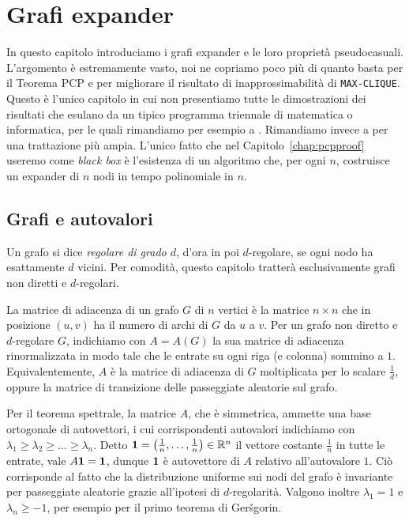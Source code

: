 \chapter{Grafi expander} \label{chap:expander}

In questo capitolo introduciamo i grafi expander e le loro proprietà
pseudocasuali. L'argomento è estremamente vasto, noi ne copriamo poco più di
quanto basta per il Teorema PCP e per migliorare il risultato di
inapprossimabilità di \texttt{MAX-CLIQUE}.
Questo è l'unico capitolo in cui non presentiamo tutte le dimostrazioni dei
risultati che esulano da un tipico programma triennale di matematica o
informatica, per le quali rimandiamo per esempio a \cite{ABbook}.
Rimandiamo invece a \cite{Tre16, HLW06} per una trattazione più ampia.
L'unico fatto che nel Capitolo~\ref{chap:pcpproof} useremo come
\emph{black box} è l'esistenza di un algoritmo che, per ogni $n$, costruisce
un expander di $n$ nodi in tempo polinomiale in $n$.

\section{Grafi e autovalori}

Un grafo si dice \emph{regolare di grado $d$}, d'ora in poi $d$-regolare, se
ogni nodo ha esattamente $d$ vicini. Per comodità, questo capitolo tratterà
esclusivamente grafi non diretti e $d$-regolari.

La matrice di adiacenza di un grafo $G$ di $n$ vertici è la matrice
$n \times n$ che in posizione $(u, v)$ ha il numero di archi di $G$
da $u$ a $v$.
Per un grafo non diretto e $d$-regolare $G$, indichiamo con $A = A(G)$ la sua
matrice di adiacenza rinormalizzata in modo tale che le entrate su ogni riga
(e colonna) sommino a $1$. Equivalentemente, $A$ è la matrice di adiacenza di
$G$ moltiplicata per lo scalare $\frac1{d}$, oppure la matrice di transizione
delle passeggiate aleatorie sul grafo.

Per il teorema spettrale, la matrice $A$, che è simmetrica, ammette una base
ortogonale di autovettori, i cui corrispondenti autovalori indichiamo con
$\lambda_1 \ge \lambda_2 \ge \dots \ge \lambda_n$.
Detto $\bm{1} = \bigl(\frac1{n}, \dots, \frac1{n}\bigr) \in \mathbb{R}^n$ il vettore costante
$\frac1{n}$ in tutte le entrate, vale $A \bm{1} = \bm{1}$, dunque $\bm{1}$ è
autovettore di $A$ relativo all'autovalore $1$.
Ciò corrisponde al fatto che la distribuzione uniforme sui nodi del grafo è
invariante per passeggiate aleatorie grazie all'ipotesi di $d$-regolarità.
Valgono inoltre $\lambda_1 = 1$ e $\lambda_n \ge -1$, per esempio per il primo
teorema di Ger\v{s}gorin.

